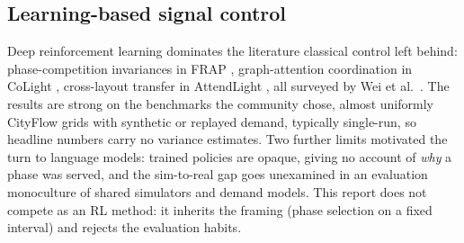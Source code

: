 \subsection{Learning-based signal control}\label{sec:bg-rl}

Deep reinforcement learning dominates the literature classical control left behind: phase-competition invariances in FRAP \cite{zheng2019frap}, graph-attention coordination in CoLight \cite{wei2019colight}, cross-layout transfer in AttendLight \cite{oroojlooy2020attendlight}, all surveyed by Wei et al.\ \cite{wei2019survey}. The results are strong on the benchmarks the community chose, almost uniformly CityFlow grids with synthetic or replayed demand, typically single-run, so headline numbers carry no variance estimates. Two further limits motivated the turn to language models: trained policies are opaque, giving no account of \emph{why} a phase was served, and the sim-to-real gap goes unexamined in an evaluation monoculture of shared simulators and demand models. This report does not compete as an RL method: it inherits the framing (phase selection on a fixed interval) and rejects the evaluation habits.
